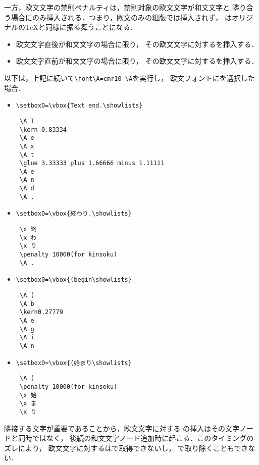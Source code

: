 \documentclass[paper=a4,twocolumn,line_length=24zw,number_of_lines=43]{jlreq}
\begin{document}
一方，欧文文字の禁則ペナルティは，禁則対象の欧文文字が和文文字と
隣り合う場合にのみ挿入される．つまり，欧文のみの組版では挿入されず，
\pTeX はオリジナルの\TeX と同様に振る舞うことになる．
\begin{itemize}
  \item 欧文文字直後が和文文字の場合に限り，
    その欧文文字に対するを挿入する．
  \item 欧文文字直前が和文文字の場合に限り，
    その欧文文字に対するを挿入する．
\end{itemize}
以下は，上記に続いて\verb+\font\A=cmr10 \A+を実行し，
欧文フォントにを選択した場合．
\begin{itemize}
  \item \verb+\setbox0=\vbox{Text end.\showlists}+
\begin{verbnote}
\begin{verbatim}
 \A T
 \kern-0.83334
 \A e
 \A x
 \A t
 \glue 3.33333 plus 1.66666 minus 1.11111
 \A e
 \A n
 \A d
 \A .
\end{verbatim}
\end{verbnote}
  \item \verb+\setbox0=\vbox{終わり.\showlists}+
\begin{verbnote}
\begin{verbatim}
 \x 終
 \x わ
 \x り
 \penalty 10000(for kinsoku)
 \A .
\end{verbatim}
\end{verbnote}
  \item \verb+\setbox0=\vbox{(begin\showlists}+
\begin{verbnote}
\begin{verbatim}
 \A (
 \A b
 \kern0.27779
 \A e
 \A g
 \A i
 \A n
\end{verbatim}
\end{verbnote}
  \item \verb+\setbox0=\vbox{(始まり\showlists}+
\begin{verbnote}
\begin{verbatim}
 \A (
 \penalty 10000(for kinsoku)
 \x 始
 \x ま
 \x り
\end{verbatim}
\end{verbnote}
\end{itemize}

隣接する文字が重要であることから，欧文文字に対する
の挿入はその文字ノードと同時ではなく，
後続の和文文字ノード追加時に起こる．このタイミングのズレにより，
欧文文字に対するはで取得できないし，
で取り除くこともできない．
\end{document}
